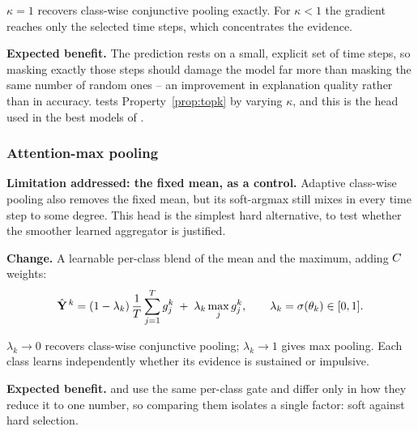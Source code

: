 \begin{property}
\label{prop:topk}
$\kappa = 1$ recovers class-wise conjunctive pooling exactly. For $\kappa < 1$ the gradient reaches
only the selected time steps, which concentrates the evidence.
\end{property}

\textbf{Expected benefit.} The prediction rests on a small, explicit set of time steps, so masking
exactly those steps should damage the model far more than masking the same number of random ones --
an improvement in explanation quality rather than in accuracy.  tests
Property~\ref{prop:topk} by varying $\kappa$, and this is the head used in the best models of
.

\subsubsection{Attention-max pooling}
\label{sec:pool:attnmax}

\textbf{Limitation addressed: the fixed mean, as a control.} Adaptive class-wise pooling also
removes the fixed
mean, but its soft-argmax still mixes in every time step to some degree. This head is the simplest
hard alternative, to test whether the smoother learned aggregator is justified.

\textbf{Change.} A learnable per-class blend of the mean and the maximum, adding $C$ weights:
\begin{equation}
  \hat{\mathbf{Y}}^{\,k} = (1-\lambda_k)\,\frac{1}{T}\sum_{j=1}^{T} g_j^k
                   \; + \; \lambda_k \max_{j} g_j^k ,
  \qquad \lambda_k = \sigma(\theta_k) \in [0,1].
  \label{eq:attnmax}
\end{equation}

\begin{property}
\label{prop:attnmax}
$\lambda_k \to 0$ recovers class-wise conjunctive pooling; $\lambda_k \to 1$ gives max pooling. Each
class learns independently whether its evidence is sustained or impulsive.
\end{property}

\textbf{Expected benefit.}  and  use the same per-class gate and
differ only in how they reduce it to one number, so comparing them isolates a single factor: soft
against hard selection.

